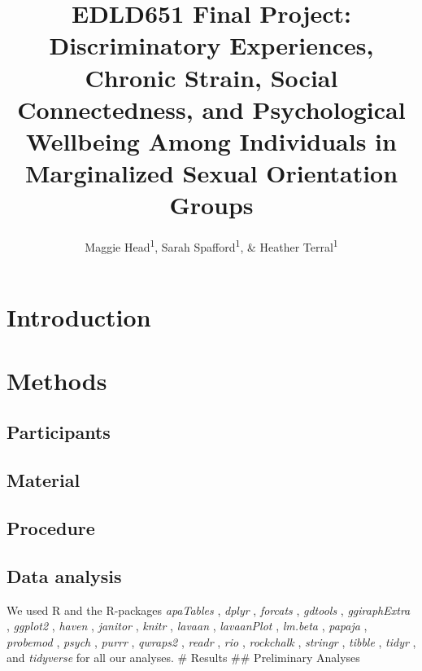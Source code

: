 \documentclass[
  english,
  man,floatsintext]{apa6}
\title{EDLD651 Final Project: Discriminatory Experiences, Chronic Strain, Social Connectedness, and Psychological Wellbeing Among Individuals in Marginalized Sexual Orientation Groups}
\author{Maggie Head\textsuperscript{1}, Sarah Spafford\textsuperscript{1}, \& Heather Terral\textsuperscript{1}}
\date{}
\affiliation{\vspace{0.5cm}\textsuperscript{1} University of Oregon}
\begin{document}
\maketitle

\hypertarget{introduction}{%
\section{Introduction}\label{introduction}}

\hypertarget{methods}{%
\section{Methods}\label{methods}}

\hypertarget{participants}{%
\subsection{Participants}\label{participants}}

\hypertarget{material}{%
\subsection{Material}\label{material}}

\hypertarget{procedure}{%
\subsection{Procedure}\label{procedure}}

\hypertarget{data-analysis}{%
\subsection{Data analysis}\label{data-analysis}}

We used R \autocite[Version 4.0.3;][]{R-base} and the R-packages \emph{apaTables} \autocite[Version 2.0.5;][]{R-apaTables}, \emph{dplyr} \autocite[Version 1.0.2;][]{R-dplyr}, \emph{forcats} \autocite[Version 0.5.0;][]{R-forcats}, \emph{gdtools} \autocite[Version 0.2.2;][]{R-gdtools}, \emph{ggiraphExtra} \autocite[Version 0.3.0;][]{R-ggiraphExtra}, \emph{ggplot2} \autocite[Version 3.3.2;][]{R-ggplot2}, \emph{haven} \autocite[Version 2.3.1;][]{R-haven}, \emph{janitor} \autocite[Version 2.0.1;][]{R-janitor}, \emph{knitr} \autocite[Version 1.30;][]{R-knitr}, \emph{lavaan} \autocites[Version 0.6.7;][]{R-lavaan,R-lavaanPlot}, \emph{lavaanPlot} \autocite[Version 0.5.1;][]{R-lavaanPlot}, \emph{lm.beta} \autocite[Version 1.5.1;][]{R-lm.beta}, \emph{papaja} \autocite[Version 0.1.0.9997;][]{R-papaja}, \emph{probemod} \autocite[Version 0.2.1;][]{R-probemod}, \emph{psych} \autocite[Version 2.0.9;][]{R-psych}, \emph{purrr} \autocite[Version 0.3.4;][]{R-purrr}, \emph{qwraps2} \autocite[Version 0.5.0;][]{R-qwraps2}, \emph{readr} \autocite[Version 1.3.1;][]{R-readr}, \emph{rio} \autocite[Version 0.5.16;][]{R-rio}, \emph{rockchalk} \autocite[Version 1.8.144;][]{R-rockchalk}, \emph{stringr} \autocite[Version 1.4.0;][]{R-stringr}, \emph{tibble} \autocite[Version 3.0.4;][]{R-tibble}, \emph{tidyr} \autocite[Version 1.1.2;][]{R-tidyr}, and \emph{tidyverse} \autocite[Version 1.3.0;][]{R-tidyverse} for all our analyses.
\# Results
\#\# Preliminary Analyses
\end{document}
